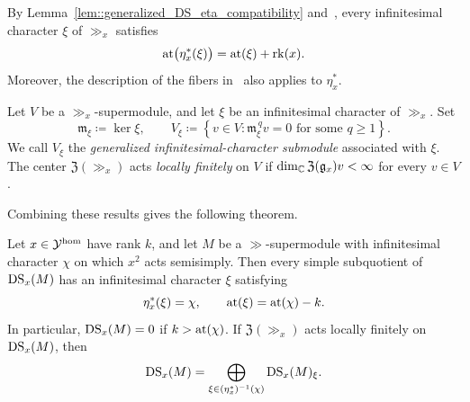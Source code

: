 By Lemma~\ref{lem::generalized_DS_eta_compatibility} and~\cite[Corollary~6.9]{duflo2005associated}, every infinitesimal character $\xi$ of $\gg_x$ satisfies
\begin{equation}\label{eq::generalized_DS_atypicality}
{\operatorname{at}}\bigl(\eta_x^{\ast}(\xi)\bigr)
=
{\operatorname{at}}(\xi)+{\operatorname{rk}}(x).
\end{equation}
Moreover, the description of the fibers in~\cite[Theorem~6.12]{gorelik2022duflo} also applies to $\eta_x^{\ast}$.

Let $V$ be a $\gg_x$-supermodule, and let $\xi$ be an infinitesimal character of $\gg_x$. Set
\begin{equation}
\mathfrak{m}_{\xi}\coloneqq\ker\xi,
\qquad
V_{\xi}\coloneqq
\left\{
v\in V:
\mathfrak{m}_{\xi}^{\,q}v=0
\text{ for some }q\geq1
\right\}.
\end{equation}
We call $V_{\xi}$ the \emph{generalized infinitesimal-character submodule} associated with $\xi$. The center $\mathfrak{Z}(\gg_x)$ acts \emph{locally finitely} on $V$ if
$
\dim_{{\mathbb C}}\mathfrak{Z}({\mathfrak{g}}_x)v<\infty$ for every $v\in V$.

Combining these results gives the following theorem.

\begin{theorem}\label{thm::generalized_DS_character}
Let $x\in{\mathcal Y}^{\hom}$ have rank $k$, and let $M$ be a $\gg$-supermodule with infinitesimal character $\chi$ on which $x^2$ acts semisimply. Then every simple subquotient of $\operatorname{DS}_x(M)$ has an infinitesimal character $\xi$ satisfying
\[
\eta_x^{\ast}(\xi)=\chi,
\qquad
{\operatorname{at}}(\xi)={\operatorname{at}}(\chi)-k.
\]
In particular, $\operatorname{DS}_x(M)=0$ if $k>{\operatorname{at}}(\chi)$. If $\mathfrak{Z}(\gg_x)$ acts locally finitely on $\operatorname{DS}_x(M)$, then
\[
\operatorname{DS}_x(M)
=
\bigoplus_{\xi\in(\eta_x^{\ast})^{-1}(\chi)}
\operatorname{DS}_x(M)_{\xi}.
\]
\end{theorem}


